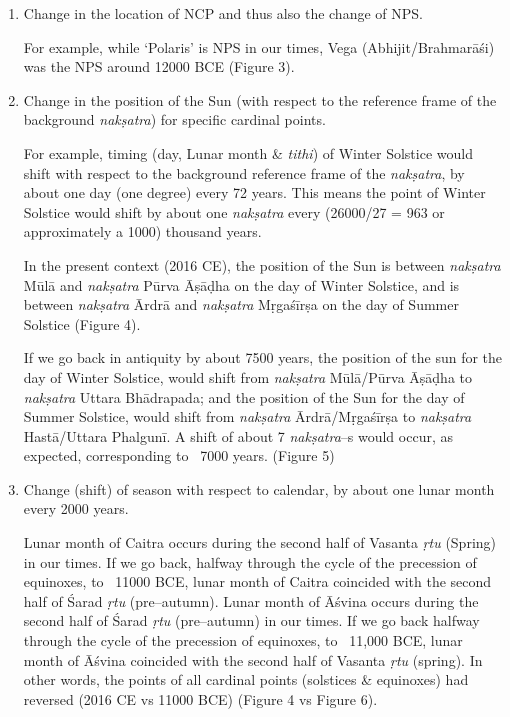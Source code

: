 \begin{enumerate}
\item 
 Change in the location of NCP and thus also the change of NPS.

 For example, while ‘Polaris’ is NPS in our times, Vega (Abhijit/Brahmarāśi) was the NPS around 12000 BCE (Figure 3).

 \item 
 Change in the position of the Sun (with respect to the reference frame of the background \textit{nakṣatra}) for specific cardinal points.

 For example, timing (day, Lunar month \& \textit{tithi}) of Winter Solstice would shift with respect to the background reference frame of the \textit{nakṣatra}, by about one day (one degree) every 72 years. This means the point of Winter Solstice would shift by about one \textit{nakṣatra} every (26000/27 = 963 or approximately a 1000) thousand years.

 In the present context (2016 CE), the position of the Sun is between \textit{nakṣatra} Mūlā and \textit{nakṣatra} Pūrva Āṣāḍha on the day of Winter Solstice, and is between \textit{nakṣatra} Ārdrā and \textit{nakṣatra} Mṛgaśīrṣa on the day of Summer Solstice (Figure 4).

\begin{figure}\end{figure}
\begin{figure}\end{figure}
If we go back in antiquity by about 7500 years, the position of the sun for the day of Winter Solstice, would shift from \textit{nakṣatra} Mūlā/Pūrva Āṣāḍha to \textit{nakṣatra} Uttara Bhādrapada; and the position of the Sun for the day of Summer Solstice, would shift from \textit{nakṣatra} Ārdrā/Mṛgaśīrṣa to \textit{nakṣatra} Hastā/Uttara Phalgunī. A shift of about 7 \textit{nakṣatra}–s would occur, as expected, corresponding to ~7000 years. (Figure 5)

\begin{figure}\end{figure}

 \item 
 Change (shift) of season with respect to calendar, by about one lunar month every 2000 years.

\begin{figure}\end{figure}
Lunar month of Caitra occurs during the second half of Vasanta \textit{ṛtu} (Spring) in our times. If we go back, halfway through the cycle of the precession of equinoxes, to ~11000 BCE, lunar month of Caitra coincided with the second half of Śarad \textit{ṛtu} (pre–autumn). Lunar month of Āśvina occurs during the second half of Śarad \textit{ṛtu} (pre–autumn) in our times. If we go back halfway through the cycle of the precession of equinoxes, to ~11,000 BCE, lunar month of Āśvina coincided with the second half of Vasanta \textit{ṛtu} (spring). In other words, the points of all cardinal points (solstices \& equinoxes) had reversed (2016 CE vs 11000 BCE) (Figure 4 vs Figure 6).

\end{enumerate}


